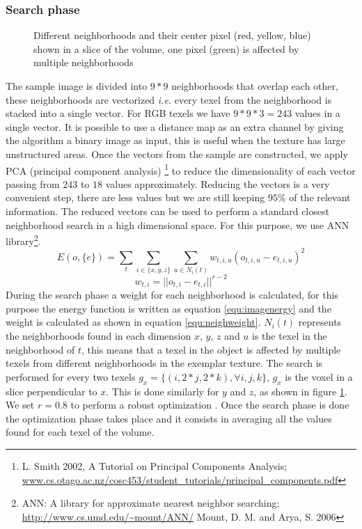 \documentclass{article}
\begin{document}
\subsubsection{Search phase}
\label{sec:SearchPhase}
%
\begin{figure}[!h]
  \vspace{-0.2cm}
  \centering
   {}
  \caption{Different neighborhoods and their center pixel (red, yellow, blue) shown in a slice of the volume, one pixel (green) is affected by multiple neighborhoods}
  \label{fig:search_phase}
  \vspace{-0.1cm}
 \end{figure}
%
The sample image is divided into $9*9$ neighborhoods that overlap each other, these neighborhoods are vectorized \emph{i.e.} 
every texel from the neighborhood is stacked into a single vector. For RGB texels we have $9 * 9 * 3 = 243$ 
values in a single vector. It is possible to 
use a distance map as an extra channel by giving the algorithm a binary image as input, 
this is useful when the texture has large unstructured areas.
Once the vectors from the sample are constructed, we apply PCA 
(principal component analysis) \footnote{L. Smith 2002, A Tutorial on Principal Components Analysis; \url{www.cs.otago.ac.nz/cosc453/student_tutorials/principal_components.pdf}}
to reduce the dimensionality of each vector passing from $243$ to $18$ values approximately.
%
Reducing the vectors is a very convenient step, there are less values but we are still keeping $95\%$ of the relevant information.
The reduced vectors can be used to perform a standard closest neighborhood search in a high dimensional space. 
For this purpose, we use ANN library\footnote{ANN: A library for approximate nearest neighbor searching; \url{http://www.cs.umd.edu/~mount/ANN/} Mount, D. M. and Arya, S. 2006}.
%
\begin{equation}
 E(o, \{e\} ) = \sum_{t} \sum_{i \in \{x, y, z\}} \sum_{u \in N_i(t)} w_{t, i, u} ( o_{t, i, u} - e_{t, i, u} )^2
 \label{equ:imagenergy} 
\end{equation}
\begin{equation}
 w_{t,i} = || o_{t, i} - e_{t, i} ||^{r - 2}
 \label{equ:neighweight}
\end{equation}
%
During the search phase a weight for each neighborhood is calculated, for this purpose the energy function 
is written as equation \ref{equ:imagenergy} and the weight is calculated
as shown in equation \ref{equ:neighweight}. $N_i(t)$ represents the neighborhoods found in each dimension $x$, $y$, $z$ 
and $u$ is the texel in the neighborhood of $t$, this means that
a texel in the object is affected by multiple texels from different neighborhoods in the exemplar texture. 
The search is performed for every two texels $g_x = \{(i, 2 * j, 2 * k), \forall i, j, k \} $, $g_x$ 
is the voxel in a slice perpendicular to $x$. This is done similarly for $y$ and $z$, as shown in figure \ref{fig:search_phase}.
We set $r = 0.8$ to perform a robust optimization \cite{kwatra:2005:SIGGRAPH}.
%
Once the search phase is done the optimization phase takes place and it consists in averaging 
all the values found for each texel of the volume. 
\end{document}
